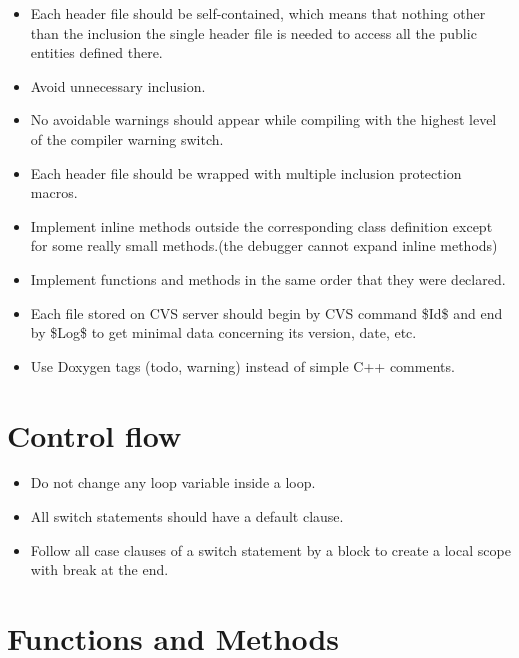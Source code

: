 \documentclass[a4paper,twoside,openright,makeidx,12pt]{report}
\begin{document}
\begin{itemize}
\item Each header file should be self-contained, which means that nothing other than the inclusion the single header file is needed to 		access all the public entities defined there.
\item Avoid unnecessary inclusion.
\item No avoidable warnings should appear while compiling with the highest level of the compiler warning switch.
\item Each header file should be wrapped with multiple inclusion protection macros.
\item Implement inline methods outside the corresponding class definition except for some really small methods.(the debugger cannot expand inline methods)
\item Implement functions and methods in the same order that they were declared.
\item Each file stored on CVS server should begin by CVS command \$Id\$ and end by \$Log\$ to get minimal data concerning its version, date, etc.
\item Use Doxygen tags (todo,  warning) instead of simple C++ comments.
\end{itemize}

\section{Control flow}

\begin{itemize}
\item Do not change any loop variable inside a loop. 
\item All switch statements should have a default clause. 
\item Follow all case clauses of a switch statement by a block to create a local scope with  break  at the end.
\end{itemize}

\section{Functions and Methods}
\end{document}
